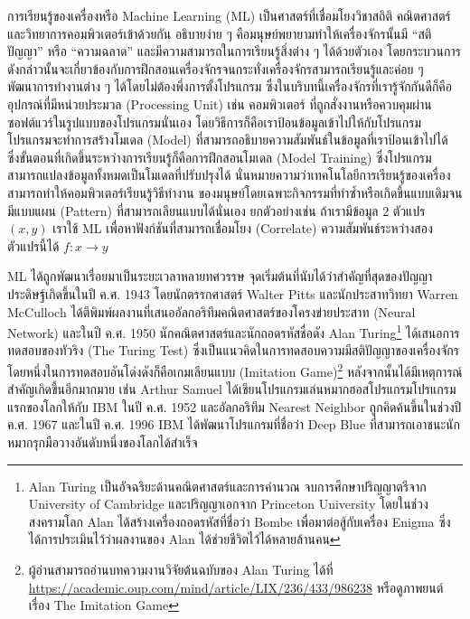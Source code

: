 การเรียนรู้ของเครื่องหรือ Machine Learning (ML) เป็นศาสตร์ที่เชื่อมโยงวิชาสถิติ คณิตศาสตร์ และวิทยาการคอมพิวเตอร์เข้าด้วยกัน
อธิบายง่าย ๆ คือมนุษย์พยายามทำให้เครื่องจักรนั้นมี \enquote{สติปัญญา} หรือ \enquote{ความฉลาด} และมีความสามารถในการเรียนรู้สิ่งต่าง ๆ 
ได้ด้วยตัวเอง โดยกระบวนการดังกล่าวนั้นจะเกี่ยวข้องกับการฝึกสอนเครื่องจักรจนกระทั่งเครื่องจักรสามารถเรียนรู้และค่อย ๆ พัฒนาการทำงานต่าง ๆ 
ได้โดยไม่ต้องพึ่งการตั้งโปรแกรม ซึ่งในบริบทนี้เครื่องจักรที่เรารู้จักกันดีก็คืออุปกรณ์ที่มีหน่วยประมวล (Processing Unit) เช่น คอมพิวเตอร์ 
ที่ถูกสั่งงานหรือควบคุมผ่านซอฟต์แวร์ในรูปแบบของโปรแกรมนั่นเอง โดยวิธีการก็คือเราป้อนข้อมูลเข้าไปให้กับโปรแกรม โปรแกรมจะทำการสร้างโมเดล
(Model) ที่สามารถอธิบายความสัมพันธ์ในข้อมูลที่เราป้อนเข้าไปได้ ซึ่งขั้นตอนที่เกิดขึ้นระหว่างการเรียนรู้ก็คือการฝึกสอนโมเดล (Model Training) 
ซึ่งโปรแกรมสามารถแปลงข้อมูลทั้งหมดเป็นโมเดลที่ปรับปรุงได้ นั่นหมายความว่าเทคโนโลยีการเรียนรู้ของเครื่องสามารถทำให้คอมพิวเตอร์เรียนรู้วิธีทำงาน%
ของมนุษย์โดยเฉพาะกิจกรรมที่ทำซ้ำหรือเกิดขึ้นแบบเดิมจนมีแบบแผน (Pattern) ที่สามารถเลียนแบบได้นั่นเอง ยกตัวอย่างเช่น ถ้าเรามีข้อมูล 2 
ตัวแปร $(x,y)$ เราใช้ ML เพื่อหาฟังก์ชันที่สามารถเชื่อมโยง (Correlate) ความสัมพันธ์ระหว่างสองตัวแปรนี้ได้ $f: x\rightarrow y$

ML ได้ถูกพัฒนาเรื่อยมาเป็นระยะเวลาหลายทศวรรษ จุดเริ่มต้นที่นับได้ว่าสำคัญที่สุดของปัญญาประดิษฐ์เกิดขึ้นในปี ค.ศ. 1943 โดยนักตรรกศาสตร์
Walter Pitts และนักประสาทวิทยา Warren McCulloch ได้ตีพิมพ์ผลงานที่เสนออัลกอริทึมคณิตศาสตร์ของโครงข่ายประสาท (Neural Network) 
และในปี ค.ศ. 1950 นักคณิตศาสตร์และนักถอดรหัสชื่อดัง Alan Turing\footnote{Alan Turing เป็นอัจฉริยะด้านคณิตศาสตร์และการคำนวณ 
จบการศึกษาปริญญาตรีจาก University of Cambridge และปริญญาเอกจาก Princeton University โดยในช่วงสงครามโลก Alan 
ได้สร้างเครื่องถอดรหัสที่ชื่อว่า Bombe เพื่อมาต่อสู้กับเครื่อง Enigma ซึ่งได้การประเมินไว้ว่าผลงานของ Alan ได้ช่วยชีวิตไว้ได้หลายล้านคน} 
ได้เสนอการทดสอบของทัวริง (The Turing Test)\autocite{turing1950} ซึ่งเป็นแนวคิดในการทดสอบความมีสติปัญญาของเครื่องจักร 
โดยหนึ่งในการทดสอบอันโด่งดังก็คือเกมเลียนแบบ (Imitation Game)\footnote{ผู้อ่านสามารถอ่านบทความงานวิจัยต้นฉบับของ Alan Turing 
ได้ที่ \url{https://academic.oup.com/mind/article/LIX/236/433/986238} หรือดูภาพยนต์เรื่อง The Imitation Game} 
หลังจากนั้นได้มีเหตุการณ์สำคัญเกิดขึ้นอีกมากมาย เช่น Arthur Samuel ได้เขียนโปรแกรมเล่นหมากฮอสโปรแกรมโปรแกรมแรกของโลกให้กับ IBM 
ในปี ค.ศ. 1952 และอัลกอริทึม Nearest Neighbor ถูกคิดค้นขึ้นในช่วงปี ค.ศ. 1967 และในปี ค.ศ. 1996 IBM ได้พัฒนาโปรแกรมที่ชื่อว่า 
Deep Blue ที่สามารถเอาชนะนักหมากรุกมือวางอันดับหนึ่งของโลกได้สำเร็จ

